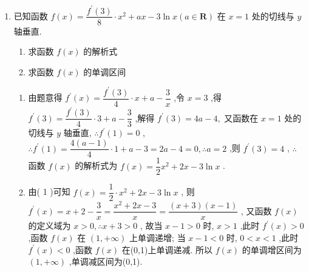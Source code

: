 \begin{enumerate}
    \item 已知函数 $f\left( x\right)  = \dfrac{{f}^{\prime }\left( 3\right) }{8} \cdot  {x}^{2} + {ax} - 3\ln x\left( {a \in  \mathbf{R}}\right)$ 在 $x = 1$ 处的切线与 $y$ 轴垂直.
    \begin{enumerate}
        \item 求函数 $f\left( x\right)$ 的解析式
        \item 求函数 $f\left( x\right)$ 的单调区间
    \end{enumerate}
    \begin{jieda}
        \begin{enumerate}
            \item 由题意得 ${f}^{\prime }\left( x\right)  = \dfrac{{f}^{\prime }\left( 3\right) }{4} \cdot  x + a - \dfrac{3}{x}$ ,令 $x = 3$ ,得 ${f}^{\prime }\left( 3\right)  = \dfrac{{f}^{\prime }\left( 3\right) }{4} \cdot  3 + a - \dfrac{3}{3}$ ,解得
            ${f}^{\prime }\left( 3\right)  = {4a} - 4,$
            又函数在 $x = 1$ 处的切线与 $y$ 轴垂直, $\therefore {f}^{\prime }\left( 1\right)  = 0$ ,
            $\therefore {f}^{\prime }\left( 1\right)  = \dfrac{4\left( {a - 1}\right) }{4} \cdot  1 + a - 3 = {2a} - 4 = 0,\therefore a = 2$ ,则 ${f}^{\prime }\left( 3\right)  = 4$ ,
            $\therefore$ 函数 $f\left( x\right)$ 的解析式为 $f\left( x\right)  = \dfrac{1}{2}{x}^{2} + {2x} - 3\ln x$ .
            \item 由( 1 )可知 $f\left( x\right)  = \dfrac{1}{2} \cdot  {x}^{2} + {2x} - 3\ln x$ ,
            则 ${f}^{\prime }\left( x\right)  = x + 2 - \dfrac{3}{x} = \dfrac{{x}^{2} + {2x} - 3}{x} = \dfrac{\left( {x + 3}\right) \left( {x - 1}\right) }{x}$ ,
            又函数 $f\left( x\right)$ 的定义域为 $x > 0,\therefore x + 3 > 0$ ,
            故当 $x - 1 > 0$ 时, $x > 1$ ,此时 ${f}^{\prime }\left( x\right)  > 0$ ,函数 $f\left( x\right)$ 在 $\left( {1, + \infty }\right)$ 上单调递增;
            当 $x - 1 < 0$ 时, $0 < x < 1$ ,此时 ${f}^{\prime }\left( x\right)  < 0$ ,函数 $f\left( x\right)$ 在(0,1)上单调递减.
            所以 $f\left( x\right)$ 的单调增区间为 $\left( {1, + \infty }\right)$ ,单调减区间为(0,1).
        \end{enumerate}
    \end{jieda}
    

\end{enumerate}
